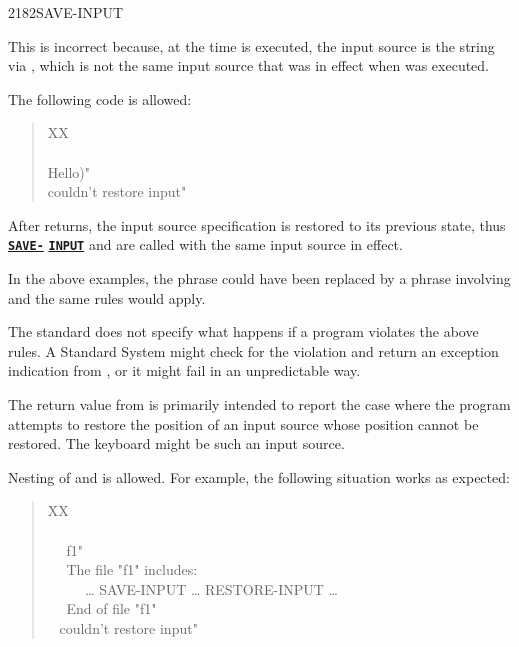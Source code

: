 \begin{worddef}{2182}{SAVE-INPUT}
\begin{rationale}
		This is incorrect because, at the time  is
		executed, the input source is the string via ,
		which is not the same input source that was in effect when
		 was executed.

		The following code is allowed:

		\begin{quote}\ttfamily
			\word{:} XX \\
			\tab {} ~  \\
			\tab {}  Hello)"  \\
			\tab {}  couldn't restore input" \\
			\word{;}
		\end{quote}

		After  returns, the input source specification
		is restored to its previous state, thus
		\hyperref{}{core}{SAVE-INPUT}{\textbf{\texttt{SAVE-}}}
		\hyperref{}{core}{SAVE-INPUT}{\textbf{\texttt{INPUT}}}
		and  are called with the same input source
		in effect.

		In the above examples, the  phrase could have
		been replaced by a phrase involving 
		and the same rules would apply.

		The standard does not specify what happens if a program
		violates the above rules. A Standard System might check for
		the violation and return an exception indication from
		, or it might fail in an unpredictable
		way.

		The return value from  is primarily
		intended to report the case where the program attempts to
		restore the position of an input source whose position cannot
		be restored. The keyboard might be such an input source.

		Nesting of  and  is
		allowed. For example, the following situation works as
		expected:

		\begin{quote}\ttfamily
			\word{:} XX \\
			\tab {} \\
			\tab~~  f1"  \\
			\tab~~  The file "f1" includes: \\
			\tab~~  ~~ {\ldots} SAVE-INPUT {\ldots} RESTORE-INPUT {\ldots} \\
			\tab~~  End of file "f1" \\
			\tab {} ~  couldn't restore input" \\
			\word{;}
		\end{quote}


\end{rationale}
\end{worddef}
